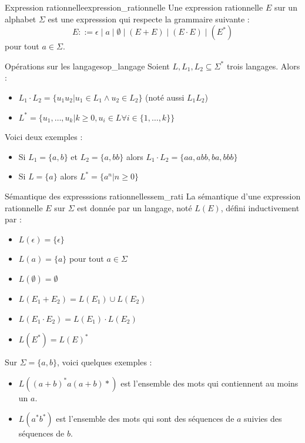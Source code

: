 \begin{definition}{Expression rationnelle}{expression_rationnelle}
    Une expression rationnelle $E$ sur un alphabet $\Sigma$ est une expresssion qui respecte la grammaire suivante :
    \begin{equation*}
        E ::= \epsilon\; |\; a\; |\; \emptyset\; |\; (E + E)\; |\; (E \cdot E)\; |\; (E^*)
    \end{equation*}
    pour tout $a \in \Sigma$.
\end{definition}
\begin{definition}{Opérations sur les langages}{op_langage}
    Soient $L,L_1,L_2\subseteq\Sigma^*$ trois langages. Alors :
    \begin{itemize}[label=\textbullet]
        \item $L_1\cdot L_2 = \{u_1 u_2 | u_1\in L_1 \wedge u_2\in L_2\}$ (noté aussi $L_1L_2$)
        \item $L^* = \{u_1,\dots,u_k | k\geq 0, u_i\in L \forall i\in \{1,\dots,k\}\}$
    \end{itemize}
\end{definition}
\begin{example}
    Voici deux exemples :
    \begin{itemize}[label=\textbullet]
        \item Si $L_1 = \{a,b\}$ et $L_2 = \{a,bb\}$ alors $L_1\cdot L_2 = \{aa,abb,ba,bbb\}$
        \item Si $L = \{a\}$ alors $L^* = \{a^n|n\geq 0\}$
    \end{itemize}
\end{example}
\begin{definition}{Sémantique des expresssions rationnelles}{sem_rati}
    La sémantique d'une expression rationnelle $E$ sur $\Sigma$ est donnée par un langage, noté $L(E)$, défini inductivement
    par :
    \begin{itemize}
        \item $L(\epsilon) = \{\epsilon\}$
        \item $L(a) = \{a\}$ pour tout $a\in\Sigma$
        \item $L(\emptyset) = \emptyset$
        \item $L(E_1 + E_2) = L(E_1) \cup L(E_2)$
        \item $L(E_1 \cdot E_2) = L(E_1) \cdot L(E_2)$
        \item $L(E^*) = L(E)^*$
    \end{itemize}
\end{definition}
\begin{example}
    Sur $\Sigma = \{a,b\}$, voici quelques exemples :
    \begin{itemize}
        \item $L((a+b)^*a(a+b)*)$ est l'ensemble des mots qui contiennent au moins un $a$.
        \item $L(a^*b^*)$ est l'ensemble des mots qui sont des séquences de $a$ suivies des séquences de $b$.
    \end{itemize}
\end{example}




